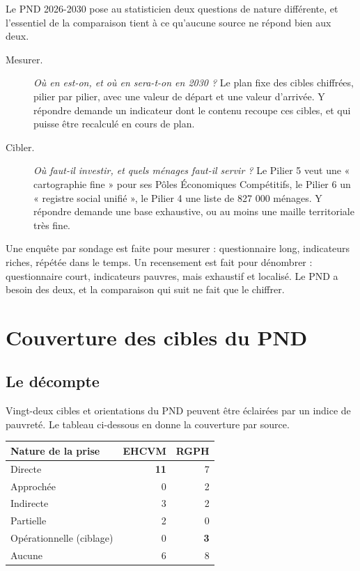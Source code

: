 \documentclass[11pt,a4paper]{article}
\begin{document}
Le PND 2026-2030 pose au statisticien deux questions de nature différente, et l'essentiel de la
comparaison tient à ce qu'aucune source ne répond bien aux deux.

\begin{description}
  \item[Mesurer.] \emph{Où en est-on, et où en sera-t-on en 2030 ?} Le plan fixe des cibles
    chiffrées, pilier par pilier, avec une valeur de départ et une valeur d'arrivée. Y répondre
    demande un indicateur dont le contenu recoupe ces cibles, et qui puisse être recalculé en cours
    de plan.
  \item[Cibler.] \emph{Où faut-il investir, et quels ménages faut-il servir ?} Le Pilier 5 veut
    une « cartographie fine » pour ses Pôles Économiques Compétitifs, le Pilier 6 un « registre
    social unifié », le Pilier 4 une liste de 827 000 ménages. Y répondre demande une base
    exhaustive, ou au moins une maille territoriale très fine.
\end{description}

\begin{retenir}
Une enquête par sondage est faite pour mesurer : questionnaire long, indicateurs riches, répétée
dans le temps. Un recensement est fait pour dénombrer : questionnaire court, indicateurs pauvres,
mais exhaustif et localisé. Le PND a besoin des deux, et la comparaison qui suit ne fait que le
chiffrer.
\end{retenir}

\section{Couverture des cibles du PND}

\subsection{Le décompte}

Vingt-deux cibles et orientations du PND peuvent être éclairées par un indice de pauvreté. Le
tableau ci-dessous en donne la couverture par source.

\begin{center}
\begin{tabular}{@{}lrr@{}}
\toprule
\textbf{Nature de la prise} & \textbf{EHCVM} & \textbf{RGPH} \\
\midrule
Directe & \textbf{11} & 7 \\
Approchée & 0 & 2 \\
Indirecte & 3 & 2 \\
Partielle & 2 & 0 \\
Opérationnelle (ciblage) & 0 & \textbf{3} \\
Aucune & 6 & 8 \\
\bottomrule
\end{tabular}
\end{center}
\end{document}
